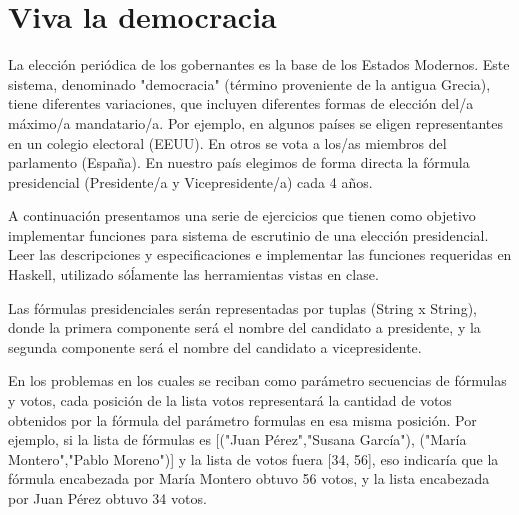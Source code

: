 
\usepackage{caratula}
\usepackage{enumerate}
\usepackage{hyperref}
\usepackage{graphicx}
\usepackage{amsfonts}
\usepackage{enumitem}

\decimalpoint
\hypersetup{colorlinks=true, linkcolor=black, urlcolor=blue}
\setlength{\parindent}{0em}
\setlength{\parskip}{0.5em}
\setcounter{tocdepth}{2} %
\setcounter{section}{0} %
\renewcommand{\thesubsubsection}{\thesubsection.\Alph{subsubsection}}
\graphicspath{ {images/} }

\everymath{\displaystyle}



	
	\maketitle
	\newpage
	
	\section{Viva la democracia}
	La elección periódica de los gobernantes es la base de los Estados Modernos. Este sistema, denominado "democracia" (término proveniente de la antigua Grecia), tiene diferentes variaciones, que incluyen diferentes formas de elección del/a máximo/a mandatario/a. Por ejemplo, en algunos países se eligen representantes en un colegio electoral (EEUU). En otros se vota a los/as miembros del parlamento (España). En nuestro país elegimos de forma directa la fórmula presidencial (Presidente/a y Vicepresidente/a) cada 4 años.
	
	A continuación presentamos una serie de ejercicios que tienen como objetivo implementar funciones para sistema de escrutinio de una elección presidencial. Leer las descripciones y especificaciones e implementar las funciones requeridas en Haskell, utilizado sóĺamente las herramientas vistas en clase.
	
	Las fórmulas presidenciales serán representadas por tuplas (String x String), donde la primera componente será el nombre del candidato a presidente, y la segunda componente será el nombre del candidato a vicepresidente.
	
	En los problemas en los cuales se reciban como parámetro secuencias de fórmulas y votos, cada posición de la lista votos representará la cantidad de votos obtenidos por la fórmula del parámetro formulas en esa misma posición. Por ejemplo, si la lista de fórmulas es [("Juan Pérez","Susana García"), ("María Montero","Pablo Moreno")] y la lista de votos fuera [34, 56], eso indicaría que la fórmula encabezada por María Montero obtuvo 56 votos, y la lista encabezada por Juan Pérez obtuvo 34 votos.
	
